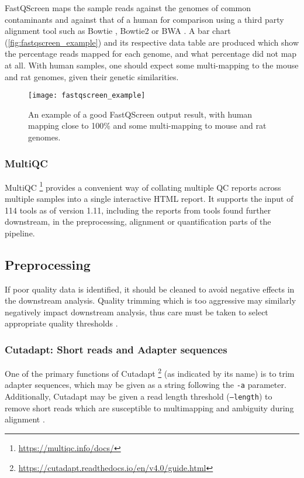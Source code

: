 FastQScreen maps the sample reads against the genomes of common contaminants and against that of a human for comparison using a third party alignment tool such as Bowtie \citep{bowtie}, Bowtie2 \citep{bowtie2} or BWA \citep{bwa}. A bar chart (\autoref{fig:fastqscreen_example}) and its respective data table are produced which show the percentage reads mapped for each genome, and what percentage did not map at all. With human samples, one should expect some multi-mapping to the mouse and rat genomes, given their genetic similarities.

\begin{figure}[!ht]
    \centering
    \texttt{[image: fastqscreen\_example]}
    \caption[FastQScreen plot example]{An example of a good FastQScreen output result, with human mapping close to 100\% and some multi-mapping to mouse and rat genomes. } 
    \label{fig:fastqscreen_example}
\end{figure}
\clearpage

\subsubsection{MultiQC}
MultiQC \footnote{\url{https://multiqc.info/docs/}} \citep{multiqc} provides a convenient way of collating multiple QC reports across multiple samples into a single interactive HTML report. It supports the input of 114 tools as of version 1.11, including the reports from tools found further downstream, in the preprocessing, alignment or quantification parts of the pipeline. 

\subsection{Preprocessing}
If poor quality data is identified, it should be cleaned to avoid negative effects in the downstream analysis. Quality trimming which is too aggressive may similarly negatively impact downstream analysis, thus care must be taken to select appropriate quality thresholds \citep{davis2019}.

\subsubsection{Cutadapt: Short reads and Adapter sequences}
\label{cutadapt}
One of the primary functions of Cutadapt \footnote{\url{https://cutadapt.readthedocs.io/en/v4.0/guide.html}} \citep{martin2011cutadapt} (as indicated by its name) is to trim adapter sequences, which may be given as a string following the \texttt{-a} parameter. Additionally, Cutadapt may be given a read length threshold (\texttt{--length}) to remove short reads which are susceptible to multimapping and ambiguity during alignment \citep{deschamps2020handling}. 

